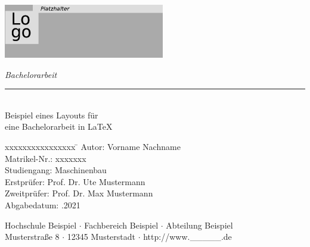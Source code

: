 \documentclass[12pt,a4paper]{scrbook}
\begin{document}
 
\begin{titlepage}
     
     \begin{flushleft} 
         \includegraphics[width=7cm]{logo.png}
     \end{flushleft} 
     
     \begin{flushright}
         \vspace{2cm}
         \LARGE \textsl{Bachelorarbeit}\\
         \rule{0.6\textwidth}{0.4pt} ~\\
         \vspace{0.5cm}
         \textsf{\LARGE Beispiel eines Layouts für}\\
         \textsf{\LARGE eine Bachelorarbeit in \LaTeX}
     \end{flushright}
     
     \vspace{3cm}
     \large
     \begin{tabbing}
         xxxxxxxxxxxxxxxx \= \kill
         Autor: \> Vorname Nachname \\
         Matrikel-Nr.: \> xxxxxxx \\
         Studiengang: \> Maschinenbau \\ [0.5cm]
         Erstprüfer: \> Prof. Dr. Ute Mustermann \\
         Zweitprüfer: \> Prof. Dr. Max Mustermann \\ [0.5cm]
         Abgabedatum: .2021 \\
     \end{tabbing}
     
     \vspace{3cm}
     \small
     \begin{center}
         Hochschule Beispiel $\cdot$ 
         Fachbereich Beispiel $\cdot$ 
         Abteilung Beispiel \\
         Musterstraße 8 $\cdot$ 
         12345 Musterstadt $\cdot$ 
         http://www.\_\_\_\_\_.de
     \end{center}
     
\end{titlepage}
\newpage

\tableofcontents
\cleardoublepage
\end{document}
